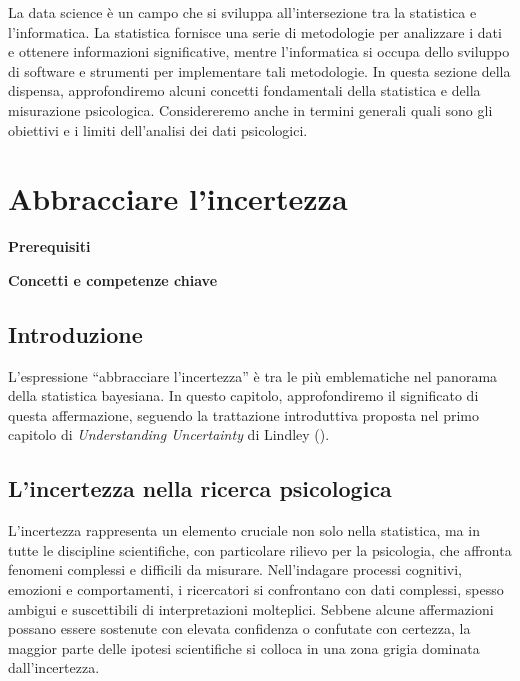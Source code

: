 \documentclass[
  letterpaper,
  DIV=11,
  numbers=noendperiod]{scrreprt}
\theoremstyle{definition}
\theoremstyle{remark}
\begin{document}

La data science è un campo che si sviluppa all'intersezione tra la
statistica e l'informatica. La statistica fornisce una serie di
metodologie per analizzare i dati e ottenere informazioni significative,
mentre l'informatica si occupa dello sviluppo di software e strumenti
per implementare tali metodologie. In questa sezione della dispensa,
approfondiremo alcuni concetti fondamentali della statistica e della
misurazione psicologica. Considereremo anche in termini generali quali
sono gli obiettivi e i limiti dell'analisi dei dati psicologici.

\chapter{Abbracciare l'incertezza}\label{sec-uncertainty}

\textbf{Prerequisiti}

\textbf{Concetti e competenze chiave}

\section{Introduzione}\label{introduzione-1}

L'espressione ``abbracciare l'incertezza'' è tra le più emblematiche nel
panorama della statistica bayesiana. In questo capitolo, approfondiremo
il significato di questa affermazione, seguendo la trattazione
introduttiva proposta nel primo capitolo di \emph{Understanding
Uncertainty} di Lindley
().

\section{L'incertezza nella ricerca
psicologica}\label{lincertezza-nella-ricerca-psicologica}

L'incertezza rappresenta un elemento cruciale non solo nella statistica,
ma in tutte le discipline scientifiche, con particolare rilievo per la
psicologia, che affronta fenomeni complessi e difficili da misurare.
Nell'indagare processi cognitivi, emozioni e comportamenti, i
ricercatori si confrontano con dati complessi, spesso ambigui e
suscettibili di interpretazioni molteplici. Sebbene alcune affermazioni
possano essere sostenute con elevata confidenza o confutate con
certezza, la maggior parte delle ipotesi scientifiche si colloca in una
zona grigia dominata dall'incertezza.
\end{document}
